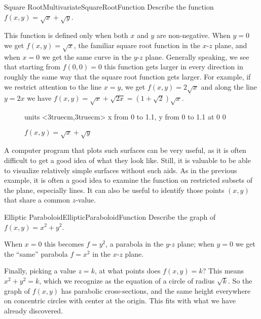 \begin{example}{Square Root}{MultivariateSquareRootFunction}
Describe the function $f(x,y)=\sqrt x+\sqrt y$.
\end{example}
\begin{solution}
This function is defined only when
both $x$ and $y$ are non-negative. When $y=0$ we get $f(x,y)=\sqrt x$,
the familiar square root function in the $x$-$z$ plane, and when $x=0$
we get the same curve in the $y$-$z$ plane. Generally speaking, we see
that starting from $f(0,0)=0$ this function gets larger in every direction
in roughly the same way that the square root function gets
larger. For example, if we restrict attention to the line $x=y$, we
get $f(x,y)=2\sqrt x$ and along the line $y=2x$ we have $f(x,y)=\sqrt
x+\sqrt{2x}=(1+\sqrt2)\sqrt x$.
\end{solution}

\begin{figure}[H]
\centerline{
\vbox{\beginpicture
\normalgraphs
\setcoordinatesystem units <3truecm,3truecm>
\setplotarea x from 0 to 1.1, y from 0 to 1.1
 at 0 0
\endpicture}}
\caption{$f(x,y)=\sqrt{x}+\sqrt{y}$}
\label{fig:double square root}
\end{figure}

A computer program that plots such surfaces can be very useful, as it
is often difficult to get a good idea of what they look like. Still,
it is valuable to be able to visualize relatively simple surfaces
without such aids. As in the previous example, it is often a good idea
to examine the function on restricted subsets of the plane, especially
lines. It can also be useful to identify those points $(x,y)$ that
share a common $z$-value.

\begin{example}{Elliptic Paraboloid}{EllipticParaboloidFunction}
Describe the graph of $f(x,y)=x^2+y^2$.
\end{example}
\begin{solution}
When $x=0$ this becomes
$f=y^2$, a parabola in the $y$-$z$ plane; when $y=0$ we get the
``same'' parabola $f=x^2$ in the $x$-$z$ plane. 

Finally, picking a value $z=k$, at what points does
$f(x,y)=k$? This means $x^2+y^2=k$, which we recognize as the equation
of a circle of radius $\sqrt k$. So the graph of $f(x,y)$ has
parabolic cross-sections, and the same height everywhere on concentric
circles with center at the origin. This fits with what we have already
discovered. 
\end{solution}

